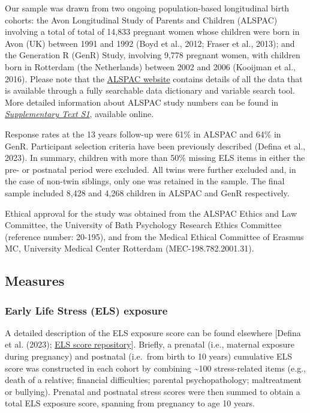 \documentclass[
  letterpaper,
  DIV=11,
  numbers=noendperiod]{scrreport}
\begin{document}
Our sample was drawn from two ongoing population-based longitudinal
birth cohorts: the Avon Longitudinal Study of Parents and Children
(ALSPAC) involving a total of total of 14,833 pregnant women whose
children were born in Avon (UK) between 1991 and 1992 (Boyd et al.,
2012; Fraser et al., 2013); and the Generation R (GenR) Study, involving
9,778 pregnant women, with children born in Rotterdam (the Netherlands)
between 2002 and 2006 (Kooijman et al., 2016). Please note that the
\href{http://www.bristol.ac.uk/alspac/researchers/our-data/}{ALSPAC
website} contains details of all the data that is available through a
fully searchable data dictionary and variable search tool. More detailed
information about ALSPAC study numbers can be found in
\href{https://osf.io/9vky4}{\emph{Supplementary Text S1}}, available
online.

Response rates at the 13 years follow-up were 61\% in ALSPAC and 64\% in
GenR. Participant selection criteria have been previously described
(Defina et al., 2023). In summary, children with more than 50\% missing
ELS items in either the pre- or postnatal period were excluded. All
twins were further excluded and, in the case of non-twin siblings, only
one was retained in the sample. The final sample included 8,428 and
4,268 children in ALSPAC and GenR respectively.

Ethical approval for the study was obtained from the ALSPAC Ethics and
Law Committee, the University of Bath Psychology Research Ethics
Committee (reference number: 20-195), and from the Medical Ethical
Committee of Erasmus MC, University Medical Center Rotterdam
(MEC-198.782.2001.31).

\subsection{Measures}\label{measures-1}

\subsubsection{Early Life Stress (ELS)
exposure}\label{early-life-stress-els-exposure}

A detailed description of the ELS exposure score can be found elsewhere
{[}Defina et al. (2023);
\href{https://github.com/SereDef/cumulative-ELS-score}{ELS score
repository}{]}. Briefly, a prenatal (i.e., maternal exposure during
pregnancy) and postnatal (i.e.~from birth to 10 years) cumulative ELS
score was constructed in each cohort by combining \textasciitilde100
stress-related items (e.g., death of a relative; financial difficulties;
parental psychopathology; maltreatment or bullying). Prenatal and
postnatal stress scores were then summed to obtain a total ELS exposure
score, spanning from pregnancy to age 10 years.
\end{document}
